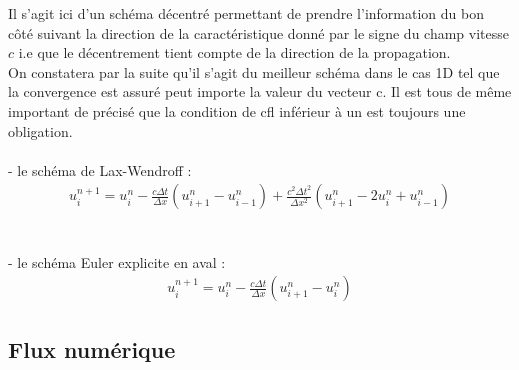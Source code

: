 \documentclass[12pt]{article}
\begin{document}
\noindent Il s'agit ici d'un schéma décentré permettant de prendre l'information du bon côté suivant la direction de la caractéristique donné par le signe du champ vitesse $c$ i.e que le décentrement tient compte de la direction de la propagation.
\\On constatera par la suite qu'il s'agit du meilleur schéma dans le cas 1D tel que la convergence est assuré peut importe la valeur du vecteur c. Il est tous de même important de précisé que la condition de cfl inférieur à un est toujours une obligation.
\\
\\- le schéma de Lax-Wendroff :
\\
\begin{eqnarray}
        u^{n+1}_i=u_i^n-\frac{c\Delta t}{\Delta x}({u_{i+1}^n-u_{i-1}^n}) +\frac{c^2\Delta t^2}{\Delta x^2}(u_{i+1}^n-2u_{i}^n+u^{n}_{i-1})
\end{eqnarray}
\\
\\- le schéma Euler explicite en aval :
\\
\begin{eqnarray}
        u^{n+1}_i=u_i^n-\frac{c\Delta t}{\Delta x}({u_{i+1}^n-u_{i}^n})
\end{eqnarray}

\subsection{Flux numérique}
\end{document}
